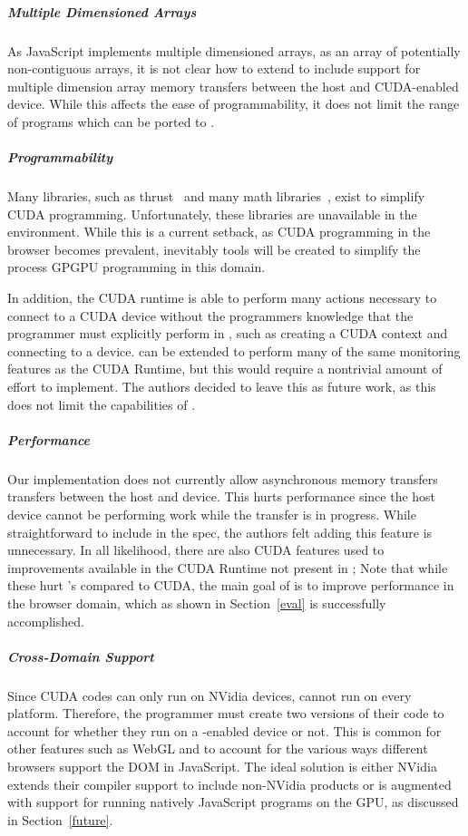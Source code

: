 \subparagraph{Multiple Dimensioned Arrays}
As JavaScript implements multiple dimensioned arrays, as an array of potentially
non-contiguous arrays, it is not clear how to extend \name to include
support for multiple dimension array memory transfers between the host and
CUDA-enabled device. While this affects the ease of programmability, it does not
limit the range of programs which can be ported to \namens.

\subparagraph{Programmability} 
Many libraries, such as thrust~\cite{thrust} and
many math libraries~\cite{magma, cuSparse, arrayFire}, exist to simplify CUDA
programming. Unfortunately, these libraries are unavailable in the \name environment. While
this is a current setback, as CUDA programming in the browser becomes prevalent,
inevitably tools will be created to simplify the process GPGPU programming in
this domain.

In addition, the CUDA runtime is able to perform many actions necessary to
connect to a CUDA device without the programmers knowledge that the programmer
must explicitly perform in \namens, such as creating a CUDA context and
connecting to a device. \name can be extended to perform many of the same
monitoring features as the CUDA Runtime, but this would require a nontrivial
amount of effort to implement. The authors decided to leave this as future work,
as this does not limit the capabilities of \namens.

\subparagraph{Performance}
Our implementation does not currently allow asynchronous memory transfers
transfers between the host and device. This hurts performance since the host
device cannot be performing work while the transfer is in progress. While
straightforward to include in the \name spec, the authors felt adding this
feature is unnecessary. In all likelihood, there are also CUDA features used to
improvements available in the CUDA Runtime not present in \namens; Note that
while these hurt \namens's compared to CUDA, the main goal of \name is to
improve performance in the browser domain, which as shown in Section~\ref{eval}
is successfully accomplished.

\subparagraph{Cross-Domain Support}
Since CUDA codes can only run on NVidia devices, \name cannot run on every
platform. Therefore, the programmer must create two versions of their code to
account for whether they run on a \namens-enabled device or not. This is common
for other features such as WebGL and to account for the various ways different
browsers support the DOM in JavaScript. The ideal solution is either NVidia
extends their compiler support to include non-NVidia products or \name is
augmented with support for running natively JavaScript programs on the GPU, as
discussed in Section~\ref{future}.

